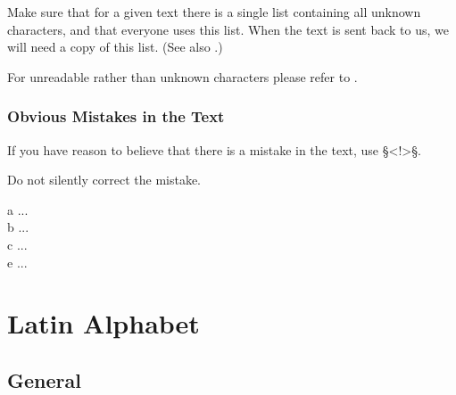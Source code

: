 \begin{note}
Make sure that for a given text there is a single list containing all unknown characters, and that everyone uses this list. When the text is sent back to us, we will need a copy of this list. (See also .)
\end{note}

\begin{crossref}
For unreadable rather than unknown characters please refer to .
\end{crossref}

\subsubsection{Obvious Mistakes in the Text}
\label{section obvious mistakes}

\begin{mainrule}
If you have reason to believe that there is a mistake in the text, use §<!>§. 
\end{mainrule}

\begin{clarification}
Do not silently correct the mistake.
\end{clarification}

\vspace{3mm}
\begin{example}

\vspace{-5mm}
\begin{typeLatin}
 a\bold{>} ...  \\
 b\bold{>} ...  \\
 c\bold{>} ...  \\
 e\bold{><!>} ...  \\
\end{typeLatin}
\end{example}


\section{Latin Alphabet}

\tocspace
\subsection{General}
\label{section latin general}

